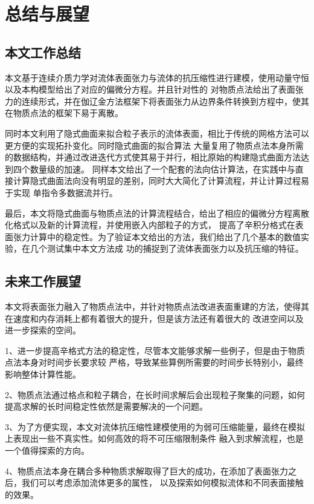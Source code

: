 \chapter{总结与展望}
\section{本文工作总结}
本文基于连续介质力学对流体表面张力与流体的抗压缩性进行建模，使用动量守恒以及本构模型给出了对应的偏微分方程。并且针对性的
对物质点法给出了表面张力的连续形式，并在伽辽金方法框架下将表面张力从边界条件转换到方程中，使其在物质点法的框架下易于离散。

同时本文利用了隐式曲面来拟合粒子表示的流体表面，相比于传统的网格方法可以更方便的实现拓扑变化。同时隐式曲面的拟合算法
大量复用了物质点法本身所需的数据结构，并通过改进迭代方式使其易于并行，相比原始的构建隐式曲面方法达到四个数量级的加速。
同样本文给出了一个配套的法向估计算法，在实践中与直接计算隐式曲面法向没有明显的差别，同时大大简化了计算流程，并让计算过程易于实现
单指令多数据流并行。

最后，本文将隐式曲面与物质点法的计算流程结合，给出了相应的偏微分方程离散化格式以及新的计算流程，并使用嵌入内部粒子的方式，
提高了辛积分格式在表面张力计算中的稳定性。为了验证本文给出的方法，我们给出了几个基本的数值实验，在几个测试集中本文方法成
功的捕捉到了流体表面张力以及抗压缩的特征。
\section{未来工作展望}
本文将表面张力融入了物质点法中，并针对物质点法改进表面重建的方法，使得其在速度和内存消耗上都有着很大的提升，但是该方法还有着很大的
改进空间以及进一步探索的空间。

1、进一步提高辛格式方法的稳定性，尽管本文能够求解一些例子，但是由于物质点法本身对时间步长要求较
严格，导致某些算例所需要的时间步长特别小，最终影响整体计算性能。

2、物质点法通过格点和粒子耦合，在长时间求解后会出现粒子聚集的问题，如何提高求解的长时间稳定性依然是需要解决的一个问题。

3、为了方便实现，本文对流体抗压缩性建模使用的为弱可压缩能量，最终在模拟上表现出一些不真实性。如何高效的将不可压缩限制条件
融入到求解流程，也是一个值得探索的方向。

4、物质点法本身在耦合多种物质求解取得了巨大的成功，在添加了表面张力之后，我们可以考虑添加流体更多的属性，
以及探索如何模拟流体和不同表面接触的效果。
